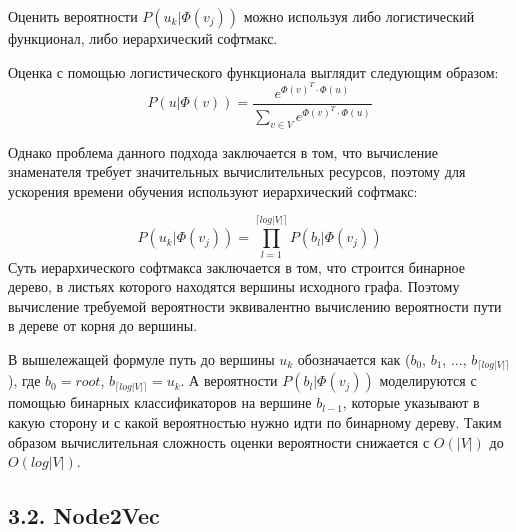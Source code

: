 Оценить вероятности $P(u_k | \Phi(v_j))$  можно используя либо логистический функционал, либо иерархический софтмакс. 

Оценка с помощью логистического функционала выглядит следующим образом:
$$P(u | \Phi(v)) = \frac{e^{\Phi(v)^T \cdot \Phi(u)}}{\sum_{v \in V} e^{\Phi(v)^T \cdot \Phi(u)}}$$

Однако проблема данного подхода заключается в том, что вычисление знаменателя требует значительных вычислительных ресурсов, поэтому для ускорения времени обучения используют иерархический софтмакс:

$$P(u_k | \Phi(v_j)) = \prod_{l=1}^{\lceil log|V| \rceil} P(b_l | \Phi(v_j))$$
Суть иерархического софтмакса заключается в том, что строится бинарное дерево, в листьях которого находятся вершины исходного графа. Поэтому вычисление требуемой вероятности эквивалентно вычислению вероятности пути в дереве от корня до вершины. 

В вышележащей формуле путь до вершины $u_k$ обозначается как ($b_0$, $b_1$, $...$, $b_{\lceil log|V| \rceil}$), где $b_0 = root$, $b_{\lceil log|V| \rceil} = u_k$. А вероятности $P(b_l | \Phi(v_j))$ моделируются с помощью бинарных классификаторов на вершине $b_{l-1}$, которые указывают в какую сторону и с какой вероятностью нужно идти по бинарному дереву. Таким образом вычислительная сложность оценки вероятности снижается с $O(|V |)$ до $O(log |V |)$.

\subsection{3.2. Node2Vec}




\clearpage